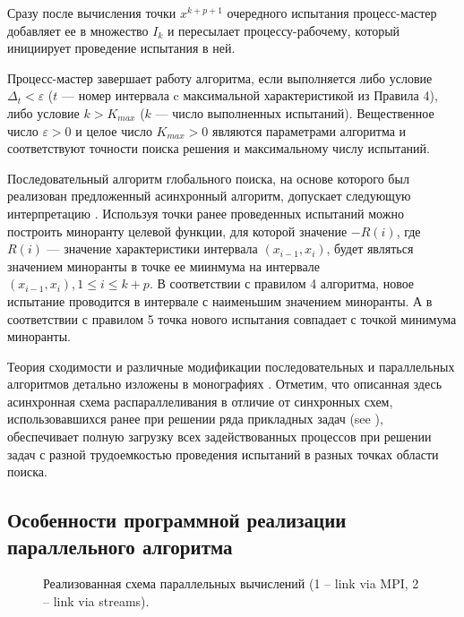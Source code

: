 \documentclass[mathematics,article,submit,pdftex,moreauthors]{Definitions/mdpi}
\begin{document}
Сразу после вычисления точки $x^{k+p+1}$ очередного испытания процесс-мастер добавляет ее в множество $I_k$ и пересылает процессу-рабочему, который инициирует проведение испытания в ней. 

Процесс-мастер завершает работу алгоритма, если выполняется либо условие $\Delta_{t}<\varepsilon$ ($t$ --- номер интервала c максимальной характеристикой из Правила 4), либо условие $k>K_{max}$ ($k$ --- число выполненных испытаний).
Вещественное число $\varepsilon>0$ и целое число $K_{max}>0$ являются параметрами алгоритма и соответствуют точности поиска решения и максимальному числу испытаний.

Последовательный алгоритм глобального поиска, на основе которого был реализован предложенный асинхронный алгоритм, допускает следующую интерпретацию \cite{Molinaro2001}. Используя точки ранее проведенных испытаний можно построить миноранту целевой функции, для которой значение $-R(i)$, где $R(i)$ --- значение характеристики интервала $(x_{i-1},x_i)$, будет являться значением миноранты в точке ее миинмума на интервале $(x_{i-1},x_i), 1\leq i\leq k+p$. В соответствии с правилом 4 алгоритма, новое испытание проводится в интервале с наименьшим значением миноранты. А в соответствии с правилом 5 точка нового испытания совпадает с точкой минимума миноранты.

Теория сходимости и различные модификации последовательных и параллельных алгоритмов детально изложены в монографиях \cite{Strongin2000,Sergeyev2017}. 
Отметим, что описанная здесь асинхронная схема распараллеливания в отличие от синхронных схем, использовавшихся ранее при решении ряда прикладных задач (see \cite{Kalyulin2017,Modorskii2016}), обеспечивает полную загрузку всех задействованных процессов при решении задач с разной трудоемкостью проведения испытаний в разных точках области поиска.


\subsection{Особенности программной реализации параллельного алгоритма}

\begin{figure}
\caption{Реализованная схема параллельных вычислений (1 -- link via MPI, 2 -- link via streams).}\label{fig:Impl}
\end{figure}   
\end{document}
